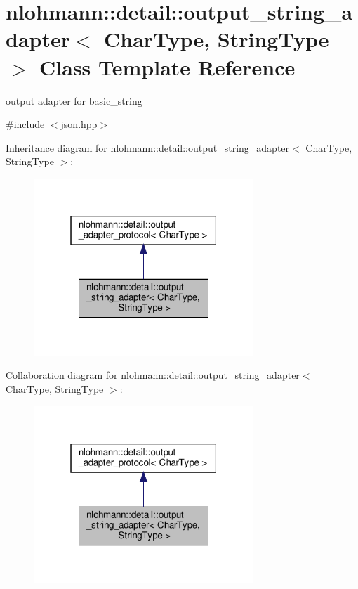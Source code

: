 \hypertarget{classnlohmann_1_1detail_1_1output__string__adapter}{}\section{nlohmann\+:\+:detail\+:\+:output\+\_\+string\+\_\+adapter$<$ Char\+Type, String\+Type $>$ Class Template Reference}
\label{classnlohmann_1_1detail_1_1output__string__adapter}


output adapter for basic\+\_\+string  




{\ttfamily \#include $<$json.\+hpp$>$}



Inheritance diagram for nlohmann\+:\+:detail\+:\+:output\+\_\+string\+\_\+adapter$<$ Char\+Type, String\+Type $>$\+:
\nopagebreak
\begin{figure}[H]
\begin{center}
\leavevmode
\includegraphics[width=235pt]{classnlohmann_1_1detail_1_1output__string__adapter__inherit__graph}
\end{center}
\end{figure}


Collaboration diagram for nlohmann\+:\+:detail\+:\+:output\+\_\+string\+\_\+adapter$<$ Char\+Type, String\+Type $>$\+:
\nopagebreak
\begin{figure}[H]
\begin{center}
\leavevmode
\includegraphics[width=235pt]{classnlohmann_1_1detail_1_1output__string__adapter__coll__graph}
\end{center}
\end{figure}
